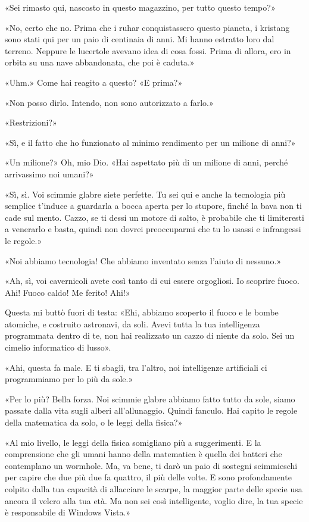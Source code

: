 «Sei rimasto qui, nascosto in questo magazzino, per tutto questo tempo?»

«No, certo che no. Prima che i ruhar conquistassero questo pianeta, i
kristang sono stati qui per un paio di centinaia di anni. Mi hanno
estratto loro dal terreno. Neppure le lucertole avevano idea di cosa
fossi. Prima di allora, ero in orbita su una nave abbandonata, che poi è
caduta.»

«Uhm.» Come hai reagito a questo? «E prima?»

«Non posso dirlo. Intendo, non sono autorizzato a farlo.»

«Restrizioni?»

«Sì, e il fatto che ho funzionato al minimo rendimento per un milione di
anni?»

«Un milione?» Oh, mio Dio. «Hai aspettato più di un milione di anni,
perché arrivassimo noi umani?»

«Sì, sì. Voi scimmie glabre siete perfette. Tu sei qui e anche la
tecnologia più semplice t'induce a guardarla a bocca aperta per lo
stupore, finché la bava non ti cade sul mento. Cazzo, se ti dessi un
motore di salto, è probabile che ti limiteresti a venerarlo e basta,
quindi non dovrei preoccuparmi che tu lo usassi e infrangessi le
regole.»

«Noi abbiamo tecnologia! Che abbiamo inventato senza l'aiuto di
nessuno.»

«Ah, sì, voi cavernicoli avete così tanto di cui essere orgogliosi. Io
scoprire fuoco. Ahi! Fuoco caldo! Me ferito! Ahi!»

Questa mi buttò fuori di testa: «Ehi, abbiamo scoperto il fuoco e le
bombe atomiche, e costruito astronavi, da soli. Avevi tutta la tua
intelligenza programmata dentro di te, non hai realizzato un cazzo di
niente da solo. Sei un cimelio informatico di lusso».

«Ahi, questa fa male. E ti sbagli, tra l'altro, noi intelligenze
artificiali ci programmiamo per lo più da sole.»

«Per lo più? Bella forza. Noi scimmie glabre abbiamo fatto tutto da
sole, siamo passate dalla vita sugli alberi all'allunaggio. Quindi
fanculo. Hai capito le regole della matematica da solo, o le leggi della
fisica?»

«Al mio livello, le leggi della fisica somigliano più a suggerimenti. E
la comprensione che gli umani hanno della matematica è quella dei
batteri che contemplano un wormhole. Ma, va bene, ti darò un paio di
sostegni scimmieschi per capire che due più due fa quattro, il più delle
volte. E sono profondamente colpito dalla tua capacità di allacciare le
scarpe, la maggior parte delle specie usa ancora il velcro alla tua età.
Ma non sei così intelligente, voglio dire, la tua specie è responsabile
di Windows Vista.»

